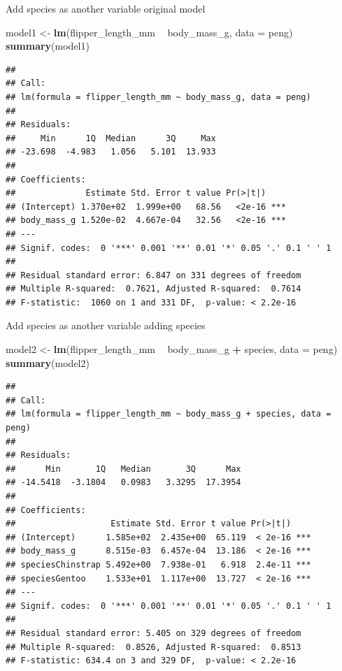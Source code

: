 \documentclass[
  ignorenonframetext,
]{beamer}
\newenvironment{Shaded}{\begin{snugshade}}{\end{snugshade}}
\newcommand{\DataTypeTok}[1]{\textcolor[rgb]{0.13,0.29,0.53}{#1}}
\newcommand{\KeywordTok}[1]{\textcolor[rgb]{0.13,0.29,0.53}{\textbf{#1}}}
\newcommand{\NormalTok}[1]{#1}
\newcommand{\OperatorTok}[1]{\textcolor[rgb]{0.81,0.36,0.00}{\textbf{#1}}}
\newcommand{\StringTok}[1]{\textcolor[rgb]{0.31,0.60,0.02}{#1}}
\begin{document}
\begin{frame}[fragile]{Add species as another variable \textbar{}
original model}
\protect\hypertarget{add-species-as-another-variable-original-model}{}

\begin{Shaded}
\begin{Highlighting}[]
\NormalTok{model1 <-}\StringTok{ }\KeywordTok{lm}\NormalTok{(flipper_length_mm }\OperatorTok{~}\StringTok{ }\NormalTok{body_mass_g, }\DataTypeTok{data =}\NormalTok{ peng)}
\KeywordTok{summary}\NormalTok{(model1)}
\end{Highlighting}
\end{Shaded}

\begin{verbatim}
## 
## Call:
## lm(formula = flipper_length_mm ~ body_mass_g, data = peng)
## 
## Residuals:
##     Min      1Q  Median      3Q     Max 
## -23.698  -4.983   1.056   5.101  13.933 
## 
## Coefficients:
##              Estimate Std. Error t value Pr(>|t|)    
## (Intercept) 1.370e+02  1.999e+00   68.56   <2e-16 ***
## body_mass_g 1.520e-02  4.667e-04   32.56   <2e-16 ***
## ---
## Signif. codes:  0 '***' 0.001 '**' 0.01 '*' 0.05 '.' 0.1 ' ' 1
## 
## Residual standard error: 6.847 on 331 degrees of freedom
## Multiple R-squared:  0.7621, Adjusted R-squared:  0.7614 
## F-statistic:  1060 on 1 and 331 DF,  p-value: < 2.2e-16
\end{verbatim}

\end{frame}

\begin{frame}[fragile]{Add species as another variable \textbar{} adding
species}
\protect\hypertarget{add-species-as-another-variable-adding-species}{}

\begin{Shaded}
\begin{Highlighting}[]
\NormalTok{model2 <-}\StringTok{ }\KeywordTok{lm}\NormalTok{(flipper_length_mm }\OperatorTok{~}\StringTok{ }\NormalTok{body_mass_g }\OperatorTok{+}\StringTok{ }\NormalTok{species, }\DataTypeTok{data =}\NormalTok{ peng)}
\KeywordTok{summary}\NormalTok{(model2)}
\end{Highlighting}
\end{Shaded}

\begin{verbatim}
## 
## Call:
## lm(formula = flipper_length_mm ~ body_mass_g + species, data = peng)
## 
## Residuals:
##      Min       1Q   Median       3Q      Max 
## -14.5418  -3.1804   0.0983   3.3295  17.3954 
## 
## Coefficients:
##                   Estimate Std. Error t value Pr(>|t|)    
## (Intercept)      1.585e+02  2.435e+00  65.119  < 2e-16 ***
## body_mass_g      8.515e-03  6.457e-04  13.186  < 2e-16 ***
## speciesChinstrap 5.492e+00  7.938e-01   6.918  2.4e-11 ***
## speciesGentoo    1.533e+01  1.117e+00  13.727  < 2e-16 ***
## ---
## Signif. codes:  0 '***' 0.001 '**' 0.01 '*' 0.05 '.' 0.1 ' ' 1
## 
## Residual standard error: 5.405 on 329 degrees of freedom
## Multiple R-squared:  0.8526, Adjusted R-squared:  0.8513 
## F-statistic: 634.4 on 3 and 329 DF,  p-value: < 2.2e-16
\end{verbatim}

\end{frame}
\end{document}
